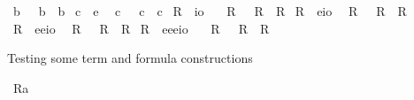 \begin{isabellebody}
\ b\ \ \ {\isachardoublequoteopen}b\ {\isasymequiv}\ {\isachardot}b{\isacharunderscore}{}{\isachardot}{\isachardoublequoteclose}\isanewline
{}\isamarkupfalse%
\ c{\isacharunderscore}{}\ {\isacharcolon}{\isacharcolon}\ {\isachardoublequoteopen}e{\isachardoublequoteclose}\ \isamarkupfalse%
\ c\ \ \ {\isachardoublequoteopen}c\ {\isasymequiv}\ {\isachardot}c{\isacharunderscore}{}{\isachardot}{\isachardoublequoteclose}\isanewline
\isanewline
{}\isamarkupfalse%
\ R{\isacharunderscore}{}\ {\isacharcolon}{\isacharcolon}\ {\isachardoublequoteopen}io{\isachardoublequoteclose}\ \ \isamarkupfalse%
\ R{}\ \ \ {\isachardoublequoteopen}R{}\ {\isasymequiv}\ {\isachardot}R{\isacharunderscore}{}{\isachardot}{\isachardoublequoteclose}\isanewline
{}\isamarkupfalse%
\ R{\isacharunderscore}{}\ {\isacharcolon}{\isacharcolon}\ {\isachardoublequoteopen}e{\isasymRightarrow}io{\isachardoublequoteclose}\ \isamarkupfalse%
\ R{}\ \ \ {\isachardoublequoteopen}R{}\ {\isasymequiv}\ {\isachardot}R{\isacharunderscore}{}{\isachardot}{\isachardoublequoteclose}\isanewline
{}\isamarkupfalse%
\ R{\isacharunderscore}{}\ {\isacharcolon}{\isacharcolon}\ {\isachardoublequoteopen}e{\isasymRightarrow}e{\isasymRightarrow}io{\isachardoublequoteclose}\ \isamarkupfalse%
\ R{}\ \ \ {\isachardoublequoteopen}R{}\ {\isasymequiv}\ {\isachardot}R{\isacharunderscore}{}{\isachardot}{\isachardoublequoteclose}\isanewline
{}\isamarkupfalse%
\ R{\isacharunderscore}{}\ {\isacharcolon}{\isacharcolon}\ {\isachardoublequoteopen}e{\isasymRightarrow}e{\isasymRightarrow}e{\isasymRightarrow}io{\isachardoublequoteclose}\ \ \isamarkupfalse%
\ R{}\ \ \ {\isachardoublequoteopen}R{}\ {\isasymequiv}\ {\isachardot}R{\isacharunderscore}{}{\isachardot}{\isachardoublequoteclose}%
\begin{isamarkuptext}%
Testing some term and formula constructions%
\end{isamarkuptext}%
\isamarkuptrue%
\isamarkupfalse%
\ {\isachardoublequoteopen}{\isacharbrackleft}{\isacharless}R{}{\isasymbullet}a{\isachargreater}{\isacharbrackright}{\isachardoublequoteclose}\ \isamarkupfalse%

\end{isabellebody}
